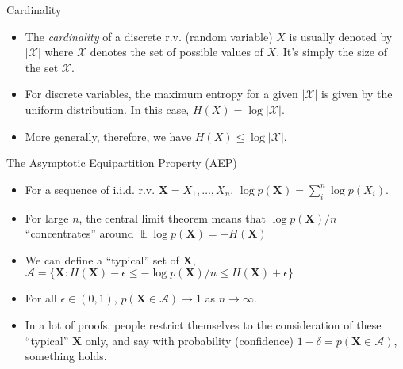 \documentclass{beamer}
\DeclareMathOperator{\E}{\mathbb{E}}
\begin{document}
\begin{frame}{Cardinality}
\begin{itemize}
	\item The \emph{cardinality} of a discrete r.v. (random variable) $X$ is usually denoted by $|\mathcal{X}|$ where $\mathcal{X}$ denotes the set of possible values of $X$. It's simply the size of the set $\mathcal{X}$. 
	\item For discrete variables, the maximum entropy for a given $|\mathcal{X}|$ is given by the uniform distribution. In this case, $H(X) = \log |\mathcal{X}|$. 
	\item More generally, therefore, we have $H(X) \leq \log |\mathcal{X}|$. 
\end{itemize}

\end{frame}


\begin{frame}{The Asymptotic Equipartition Property (AEP)}
\begin{itemize}
	\item For a sequence of i.i.d. r.v. $\boldsymbol{X} = X_1,\ldots, X_n$, $\log p(\boldsymbol{X}) = \sum_i^n \log p(X_i)$. 
	\item For large $n$, the central limit theorem means that $\log p(\boldsymbol{X})/n$ ``concentrates'' around $\E \log p(\boldsymbol{X})=-H(\boldsymbol{X})$
	\item We can define a ``typical'' set of $\boldsymbol{X}$, $\mathcal{A}=\{\boldsymbol{X}: H(\boldsymbol{X}) - \epsilon \leq -\log p(\boldsymbol{X}) /n \leq H(\boldsymbol{X}) + \epsilon \}$
	\item For all $\epsilon \in (0,1)$, $p(\boldsymbol{X} \in \mathcal{A}) \rightarrow 1$ as $n \rightarrow \infty$. 
	\item In a lot of proofs, people restrict themselves to the consideration of these ``typical'' $\boldsymbol{X}$ only, and say with probability (confidence) $1-\delta = p(\boldsymbol{X} \in \mathcal{A})$, something holds. 
\end{itemize}
\end{frame}
\end{document}
